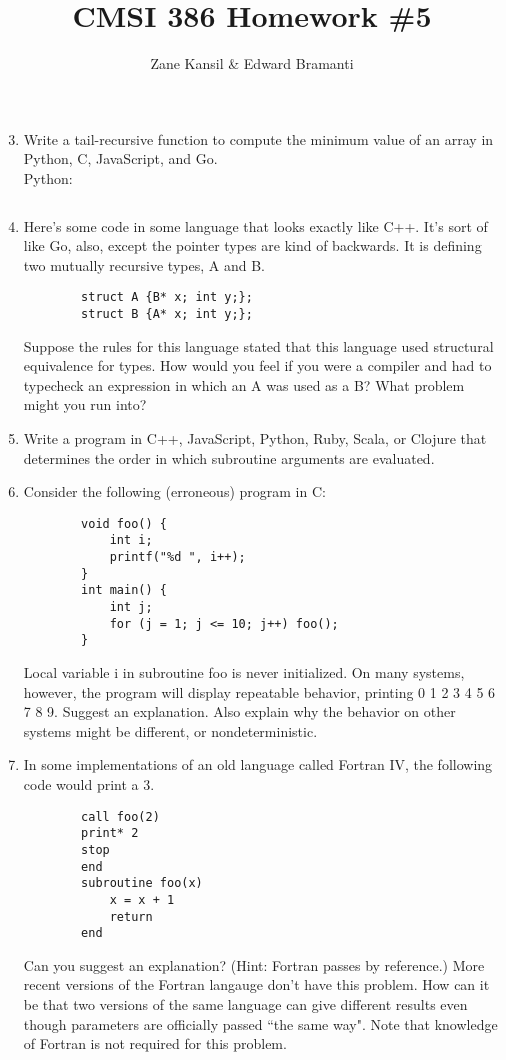\documentclass{article}
\title{CMSI 386 Homework \#5}
\author{Zane Kansil \& Edward Bramanti}
\begin{document}
\maketitle
\begin{enumerate}
	\setcounter{enumi}{2}
	\item Write a tail-recursive function to compute the minimum value of an array in Python, C, JavaScript, and Go.
	\\
	Python:
	\begin{verbatim}
	\end{verbatim}
	\pagebreak
	\item Here's some code in some language that looks exactly like C++. It's sort of like Go, also, except the pointer types are kind of backwards. It is defining two mutually recursive types, A and B.
	\begin{verbatim}
    	struct A {B* x; int y;};
    	struct B {A* x; int y;};
    \end{verbatim}
	Suppose the rules for this language stated that this language used structural equivalence for types. How would you feel if you were a compiler and had to typecheck an expression in which an A was used as a B? What problem might you run into?
	\pagebreak
	\item Write a program in C++, JavaScript, Python, Ruby, Scala, or Clojure that determines the order in which subroutine arguments are evaluated.
	\pagebreak
	\item Consider the following (erroneous) program in C:
	\begin{verbatim}
		void foo() {
		    int i;
		    printf("%d ", i++);
		}
		int main() {
		    int j;
		    for (j = 1; j <= 10; j++) foo();
		}
	\end{verbatim}
	Local variable i in subroutine foo is never initialized. On many systems, however, the program will display repeatable behavior, printing 0 1 2 3 4 5 6 7 8 9. Suggest an explanation. Also explain why the behavior on other systems might be different, or nondeterministic.
	\setcounter{enumi}{7}
	\pagebreak
	\item In some implementations of an old language called Fortran IV, the following code would print a 3. 
	\begin{verbatim} 
	    call foo(2)
	    print* 2
	    stop
	    end
	    subroutine foo(x)
	        x = x + 1
	        return
	    end
    \end{verbatim}
	Can you suggest an explanation? (Hint: Fortran passes by reference.) More recent versions of the Fortran langauge don't have this problem. How can it be that two versions of the same language can give different results even though parameters are officially passed ``the same way". Note that knowledge of Fortran is not required for this problem.

\end{enumerate}
\end{document}
